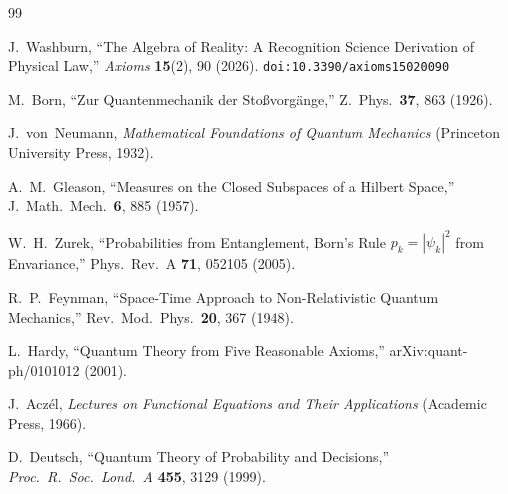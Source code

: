 \documentclass[12pt,a4paper]{article}
\theoremstyle{definition}
\theoremstyle{remark}
\begin{document}
\begin{thebibliography}{99}

J.~Washburn, ``The Algebra of Reality: A Recognition Science Derivation
of Physical Law,'' \emph{Axioms} \textbf{15}(2), 90 (2026).
\texttt{doi:10.3390/axioms15020090}

M.~Born, ``Zur Quantenmechanik der Sto\ss vorg\"ange,''
Z.\ Phys.\ \textbf{37}, 863 (1926).

J.~von~Neumann, \textit{Mathematical Foundations of Quantum
Mechanics} (Princeton University Press, 1932).

A.~M.~Gleason, ``Measures on the Closed Subspaces of a Hilbert
Space,'' J.\ Math.\ Mech.\ \textbf{6}, 885 (1957).

W.~H.~Zurek, ``Probabilities from Entanglement, Born's Rule
$p_k = |\psi_k|^2$ from Envariance,'' Phys.\ Rev.\ A
\textbf{71}, 052105 (2005).

R.~P.~Feynman, ``Space-Time Approach to Non-Relativistic
Quantum Mechanics,'' Rev.\ Mod.\ Phys.\ \textbf{20}, 367
(1948).

L.~Hardy, ``Quantum Theory from Five Reasonable Axioms,''
arXiv:quant-ph/0101012 (2001).

J.~Acz\'el, \emph{Lectures on Functional Equations and Their
Applications} (Academic Press, 1966).

D.~Deutsch, ``Quantum Theory of Probability and Decisions,''
\emph{Proc.\ R.\ Soc.\ Lond.\ A} \textbf{455}, 3129 (1999).

\end{thebibliography}
\end{document}
